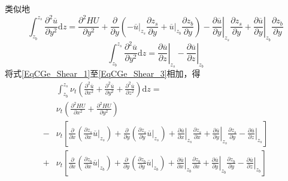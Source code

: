 类似地
\begin{equation}
  \int_{z_{b}}^{ z_{s}}\!
  \frac{\partial^{2} \overline{u}}{\partial y^{2}}
  \mathrm{d}z
  =
  \frac{\partial^{2} HU}{\partial y^{2}} +
  \frac{\partial}{\partial y}
  \left(
  -
  \left.\overline{u}\right|_{z_{s}}\frac{\partial  z_{s}}{\partial y}
  +
  \left.\overline{u}\right|_{z_{b}}\frac{\partial z_{b}}{\partial y}
  \right)
  -
  \left.\frac{\partial \overline{u}}{\partial y}\right|_{z_{s}}\frac{\partial  z_{s}}{\partial y}
  +
  \left.\frac{\partial \overline{u}}{\partial y}\right|_{z_{b}}\frac{\partial z_{b}}{\partial y}
  \label{EqCGe_Shear_2}
\end{equation}
\begin{equation}
  \int_{z_{b}}^{ z_{s}}\!
  \frac{\partial^{2} \overline{u}}{\partial y^{2}}
  \mathrm{d}z
  =
  \left.\frac{\partial \overline{u}}{\partial z}\right|_{z_{s}}
  -
  \left.\frac{\partial \overline{u}}{\partial z}\right|_{z_{b}}
  \label{EqCGe_Shear_3}
\end{equation}
将式\eqref{EqCGe_Shear_1}至\eqref{EqCGe_Shear_3}相加，得
\begin{equation}
  \begin{aligned}
    &\int_{z_{b}}^{ z_{s}}\!
    \nu_{t}
    \left(
    \frac{\partial^{2} \overline{u}}{\partial x^{2}} +
    \frac{\partial^{2} \overline{u}}{\partial y^{2}} +
    \frac{\partial^{2} \overline{u}}{\partial z^{2}}
    \right)
    \mathrm{d}z =\\
    &
    \nu_{t}
    \left(
    \frac{\partial^{2} HU}{\partial x^{2}} +
    \frac{\partial^{2} HU}{\partial y^{2}}
    \right)
    \\
    -&\nu_{t}
    \left[
      \frac{\partial}{\partial x}
      \left(
      \frac{\partial  z_{s}}{\partial x}
      \left.\overline{u}\right|_{z_{s}}
      \right)
      +
      \frac{\partial}{\partial y}
      \left(
      \frac{\partial  z_{s}}{\partial y}
      \left.\overline{u}\right|_{z_{s}}
      \right)
      +
      \left.\frac{\partial \overline{u}}{\partial x}\right|_{z_{s}}
      \frac{\partial  z_{s}}{\partial x}
      +
      \left.\frac{\partial \overline{u}}{\partial y}\right|_{z_{s}}
      \frac{\partial  z_{s}}{\partial y}
      -
      \left.\frac{\partial \overline{u}}{\partial z}\right|_{z_{s}}
    \right]
    \\
    +&\nu_{t}
    \left[
      \frac{\partial}{\partial x}
      \left(
      \frac{\partial z_{b}}{\partial x}
      \left.\overline{u}\right|_{z_{b}}
      \right)
      +
      \frac{\partial}{\partial y}
      \left(
      \frac{\partial z_{b}}{\partial y}
      \left.\overline{u}\right|_{z_{b}}
      \right)
      +
      \left.\frac{\partial \overline{u}}{\partial x}\right|_{z_{b}}
      \frac{\partial z_{b}}{\partial x}
      +
      \left.\frac{\partial \overline{u}}{\partial y}\right|_{z_{b}}
      \frac{\partial z_{b}}{\partial y}
      -
      \left.\frac{\partial \overline{u}}{\partial z}\right|_{z_{b}}
    \right]
  \end{aligned}
  \label{EqCGe_Shear_Total}
\end{equation}

